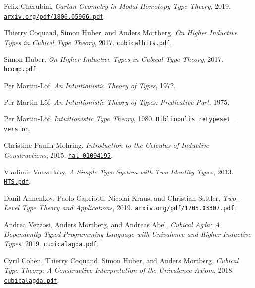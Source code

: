 \documentclass{article}
\theoremstyle{definition}
\begin{document}
\begin{thebibliography}{99}

Felix Cherubini,
\textit{Cartan Geometry in Modal Homotopy Type Theory},
2019.
\href{https://arxiv.org/pdf/1806.05966.pdf}{\texttt{arxiv.org/pdf/1806.05966.pdf}}.

Thierry Coquand, Simon Huber, and Anders Mörtberg,
\textit{On Higher Inductive Types in Cubical Type Theory},
2017.
\href{https://staff.math.su.se/anders.mortberg/papers/cubicalhits.pdf}{\texttt{cubicalhits.pdf}}.

Simon Huber,
\textit{On Higher Inductive Types in Cubical Type Theory},
2017.
\href{http://www.cse.chalmers.se/~simonhu/misc/hcomp.pdf}{\texttt{hcomp.pdf}}.

Per Martin-Löf,
\textit{An Intuitionistic Theory of Types},
1972.

Per Martin-Löf,
\textit{An Intuitionistic Theory of Types: Predicative Part},
1975.

Per Martin-Löf,
\textit{Intuitionistic Type Theory},
1980.
\href{https://raw.githubusercontent.com/michaelt/martin-lof/master/pdfs/Bibliopolis-Book-retypeset-1984.pdf}{\texttt{Bibliopolis retypeset version}}.

Christine Paulin-Mohring,
\textit{Introduction to the Calculus of Inductive Constructions},
2015.
\href{https://hal.inria.fr/hal-01094195/document}{\texttt{hal-01094195}}.

Vladimir Voevodsky,
\textit{A Simple Type System with Two Identity Types},
2013.
\href{https://www.math.ias.edu/vladimir/sites/math.ias.edu.vladimir/files/HTS.pdf}{\texttt{HTS.pdf}}.

Danil Annenkov, Paolo Capriotti, Nicolai Kraus, and Christian Sattler,
\textit{Two-Level Type Theory and Applications},
2019.
\href{https://arxiv.org/pdf/1705.03307.pdf}{\texttt{arxiv.org/pdf/1705.03307.pdf}}.

Andrea Vezzosi, Anders Mörtberg, and Andreas Abel,
\textit{Cubical Agda: A Dependently Typed Programming Language with Univalence and Higher Inductive Types},
2019.
\href{https://staff.math.su.se/anders.mortberg/papers/cubicalagda.pdf}{\texttt{cubicalagda.pdf}}.

Cyril Cohen, Thierry Coquand, Simon Huber, and Anders Mörtberg,
\textit{Cubical Type Theory: A Constructive Interpretation of the Univalence Axiom},
2018.
\href{https://staff.math.su.se/anders.mortberg/papers/cubicalagda.pdf}{\texttt{cubicalagda.pdf}}.


\end{thebibliography}
\end{document}
